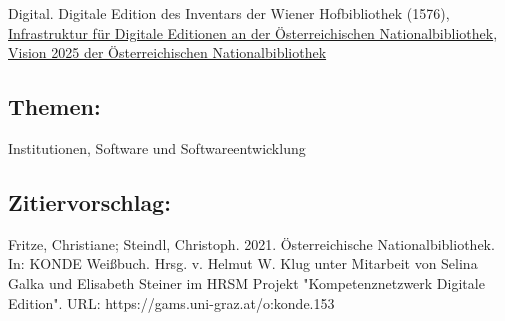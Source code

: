 \documentclass{article}
\begin{document}
{                           Digital. Digitale Edition des Inventars der Wiener Hofbibliothek
                           (1576)}, \href{https://edition.onb.ac.at/}{Infrastruktur für
                           Digitale Editionen an der Österreichischen Nationalbibliothek}, \href{https://www.onb.ac.at/ueber-uns/vision-und-strategie}{Vision 2025
                           der Österreichischen Nationalbibliothek}\subsection*{Themen:}Institutionen, Software und Softwareentwicklung\subsection*{Zitiervorschlag:}Fritze, Christiane; Steindl, Christoph. 2021. Österreichische Nationalbibliothek. In: KONDE Weißbuch. Hrsg. v. Helmut W. Klug unter Mitarbeit von Selina Galka und Elisabeth Steiner im HRSM Projekt "Kompetenznetzwerk Digitale Edition". URL: https://gams.uni-graz.at/o:konde.153\newpage
\end{document}
